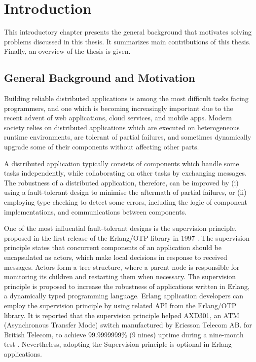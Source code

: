 \chapter{Introduction}

This introductory chapter presents the general background that motivates solving  problems discussed in this thesis.  It summarizes main contributions of this thesis.  Finally, an overview of the thesis is given.

\section{General Background and Motivation}

Building reliable distributed applications is among the most difficult tasks 
facing programmers, and one which is becoming increasingly important due to the 
recent advent of web applications, cloud services, and mobile apps.  Modern 
society relies on distributed applications which are executed on heterogeneous 
runtime environments, are tolerant of partial failures, and sometimes 
dynamically upgrade some of their components without affecting other parts.

A distributed application typically consists of components which handle some 
tasks independently, while collaborating on other tasks by exchanging
messages.  The robustness of a distributed application, therefore, 
can be improved by (i) using a fault-tolerant design to minimise the 
aftermath of partial failures, or (ii) employing type checking to detect 
some errors, including the logic of component implementations, and 
communications between components.

One of the most influential fault-tolerant designs is the supervision 
principle, proposed in the first release of the Erlang/OTP library in 1997 
\citep{OTP}. The supervision principle states that concurrent components of an 
application should be encapsulated as actors, which make local decisions in 
response to received messages.  Actors form a tree structure, where a parent 
node is responsible for monitoring its children and restarting them when 
necessary. The supervision principle is proposed to increase the robustness of 
applications written in Erlang, a dynamically typed programming language.  
Erlang application developers can employ the supervision principle by using 
related API from the Erlang/OTP library.  It is reported that the supervision 
principle helped AXD301, an ATM (Asynchronous Transfer Mode) switch 
manufactured by Ericsson Telecom AB. for British Telecom, to achieve 
99.9999999\% (9 nines) uptime during a nine-month test \citep{ArmstrongAXD}. 
Nevertheless, adopting the Supervision principle is optional in Erlang 
applications.

